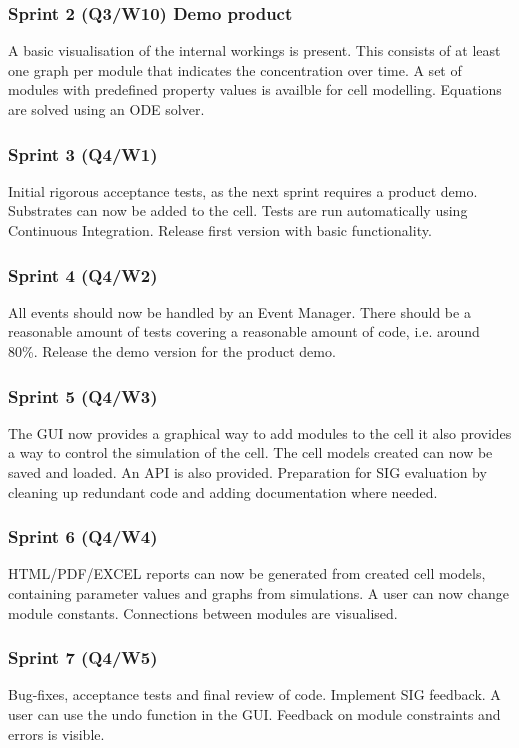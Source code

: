 \documentclass[10pt,a4paper]{report}
\begin{document}
			\subsubsection*{Sprint 2 (Q3/W10) Demo product}
				A basic visualisation of the internal workings is present. This consists of at least one graph per module that indicates the concentration over time. A set of modules with predefined property values is availble for cell modelling. Equations are solved using an ODE solver.
			\subsubsection*{Sprint 3 (Q4/W1)}
				Initial rigorous acceptance tests, as the next sprint requires a product demo. Substrates can now be added to the cell. Tests are run automatically using Continuous Integration. Release first version with basic functionality.
			\subsubsection*{Sprint 4 (Q4/W2)}
				All events should now be handled by an Event Manager. There should be a reasonable amount of tests covering a reasonable amount of code, i.e. around 80\%. Release the demo version for the product demo.
			\subsubsection*{Sprint 5 (Q4/W3)}
				The GUI now provides a graphical way to add modules to the cell it also provides a way to control the simulation of the cell. The cell models created can now be saved and loaded. An API is also provided. Preparation for SIG evaluation by cleaning up redundant code and adding documentation where needed.
			\subsubsection*{Sprint 6 (Q4/W4)}
				HTML/PDF/EXCEL reports can now be generated from created cell models, containing parameter values and graphs from simulations. A user can now change module constants. Connections between modules are visualised. 
			\subsubsection*{Sprint 7 (Q4/W5)}
				Bug-fixes, acceptance tests and final review of code. Implement SIG feedback. A user can use the undo function in the GUI. Feedback on module constraints and errors is visible.
\end{document}
